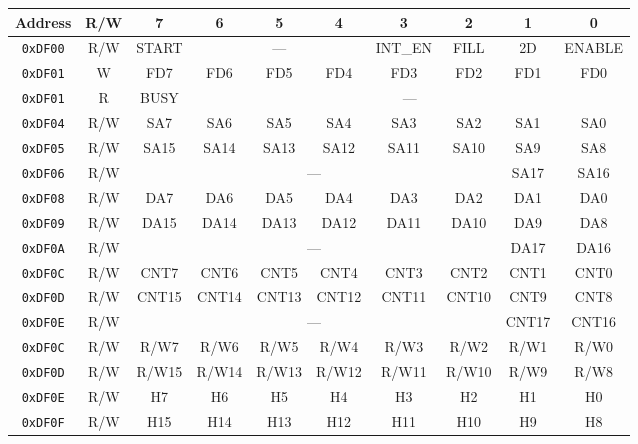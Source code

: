 \begin{table}[h]
    \begin{center}
        \begin{tabular}{|c|c|c|c|c|c|c|c|c|c|} \hline
            Address & R/W & 7 & 6 & 5 & 4 & 3 & 2 & 1 & 0 \\\hline\hline
            \verb+0xDF00+ & R/W & START & \multicolumn{3}{|c|}{---} & INT\_EN & FILL & 2D & ENABLE \\ \hline
            \verb+0xDF01+ & W & FD7 & FD6 & FD5 & FD4 & FD3 & FD2 & FD1 & FD0 \\ \hline
            \verb+0xDF01+ & R & BUSY & \multicolumn{7}{|c|}{---}  \\ \hline\hline

            \verb+0xDF04+ & R/W & SA7 & SA6 & SA5 & SA4 & SA3 & SA2 & SA1 & SA0 \\ \hline
            \verb+0xDF05+ & R/W & SA15 & SA14 & SA13 & SA12 & SA11 & SA10 & SA9 & SA8 \\ \hline
            \verb+0xDF06+ & R/W & \multicolumn{6}{|c|}{---} & SA17 & SA16 \\ \hline\hline

            \verb+0xDF08+ & R/W & DA7 & DA6 & DA5 & DA4 & DA3 & DA2 & DA1 & DA0 \\ \hline
            \verb+0xDF09+ & R/W & DA15 & DA14 & DA13 & DA12 & DA11 & DA10 & DA9 & DA8 \\ \hline
            \verb+0xDF0A+ & R/W & \multicolumn{6}{|c|}{---} & DA17 & DA16 \\ \hline\hline

            \verb+0xDF0C+ & R/W & CNT7 & CNT6 & CNT5 & CNT4 & CNT3 & CNT2 & CNT1 & CNT0 \\ \hline
            \verb+0xDF0D+ & R/W & CNT15 & CNT14 & CNT13 & CNT12 & CNT11 & CNT10 & CNT9 & CNT8 \\ \hline
            \verb+0xDF0E+ & R/W & \multicolumn{6}{|c|}{---} & CNT17 & CNT16 \\ \hline\hline

            \verb+0xDF0C+ & R/W & R/W7 & R/W6 & R/W5 & R/W4 & R/W3 & R/W2 & R/W1 & R/W0 \\ \hline
            \verb+0xDF0D+ & R/W & R/W15 & R/W14 & R/W13 & R/W12 & R/W11 & R/W10 & R/W9 & R/W8 \\ \hline
            \verb+0xDF0E+ & R/W & H7 & H6 & H5 & H4 & H3 & H2 & H1 & H0 \\ \hline
            \verb+0xDF0F+ & R/W & H15 & H14 & H13 & H12 & H11 & H10 & H9 & H8 \\ \hline\hline


\end{tabular}
\end{center}
\end{table}

